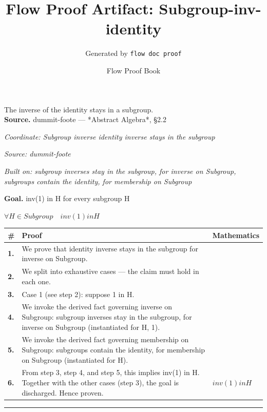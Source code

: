 \documentclass[11pt]{article}
\title{Flow Proof Artifact: Subgroup-inv-identity}
\author{Generated by \texttt{flow doc proof}}
\date{Flow Proof Book}
\theoremstyle{definition}
\begin{document}
\maketitle
The inverse of the identity stays in a subgroup.\\[0.5em]
\textbf{Source.} dummit-foote — *Abstract Algebra*, §2.2\\[0.5em]
\bigskip
{}\par
\smallskip\noindent\textit{Coordinate: Subgroup \cdot inverse \cdot identity inverse stays in the subgroup}\par
\smallskip\noindent\textit{Source: dummit-foote}\par
\smallskip\noindent\textit{Built on: subgroup inverses stay in the subgroup, for inverse on Subgroup, subgroups contain the identity, for membership on Subgroup}\par
\medskip
\noindent\textbf{Goal.} inv(1) in H for every subgroup H\par
\noindent$\displaystyle \forall H \in Subgroup\quad inv(1) in H$\par
\medskip
\noindent
\begin{tabular}{@{} >{\raggedright\arraybackslash}p{} >{\raggedright\arraybackslash}p{} >{\raggedleft\arraybackslash}p{} @{}}
\textbf{\#} & \textbf{Proof} & \textbf{Mathematics} \\
\midrule
\textbf{1.} & We prove that identity inverse stays in the subgroup for inverse on Subgroup. & \\[0.45em]
\textbf{2.} & We split into exhaustive cases — the claim must hold in each one. & \\[0.45em]
\textbf{3.} & Case 1 (see step 2): suppose 1 in H. & \\[0.45em]
\textbf{4.} & We invoke the derived fact governing inverse on Subgroup: subgroup inverses stay in the subgroup, for inverse on Subgroup (instantiated for H, 1). & \\[0.45em]
\textbf{5.} & We invoke the derived fact governing membership on Subgroup: subgroups contain the identity, for membership on Subgroup (instantiated for H). & \\[0.45em]
\textbf{6.} & From step 3, step 4, and step 5, this implies inv(1) in H. Together with the other cases (step 3), the goal is discharged. Hence proven. & $\displaystyle inv(1) in H$ \\[0.45em]
\bottomrule
\end{tabular}
\label{thm:Subgroup-inverse-identity_inverse_stays_in_the_subgroup}
\par\medskip\hrule
\end{document}
